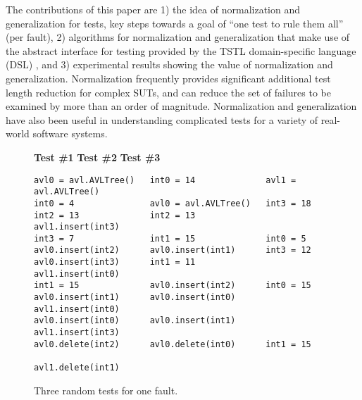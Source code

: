 The contributions of this paper are 1) the idea of normalization and
generalization for tests, key steps towards a goal of
``one test to rule them all'' (per fault), 2) algorithms for
normalization and generalization that make use of the abstract
interface for testing provided by the TSTL \cite{tstl,NFM15,ISSTA15,tstlsttt}
domain-specific language (DSL) \cite{Fow10}, and 3)
experimental results showing the value of normalization and
generalization.  Normalization frequently provides significant additional test length
reduction for complex SUTs, and can reduce
the set of failures to be examined by more than an order of
magnitude.  Normalization and generalization have also been useful in
understanding complicated tests for a variety of real-world software
systems.

\begin{figure}[t]
{\scriptsize
{\bf Test \#1}\hspace{0.415in} {\bf Test \#2} \hspace{0.41in}
{\bf Test \#3}
\begin{verbatim}
avl0 = avl.AVLTree()   int0 = 14              avl1 = avl.AVLTree()
int0 = 4               avl0 = avl.AVLTree()   int3 = 18 
int2 = 13              int2 = 13              avl1.insert(int3) 
int3 = 7               int1 = 15              int0 = 5 
avl0.insert(int2)      avl0.insert(int1)      int3 = 12 
avl0.insert(int3)      int1 = 11              avl1.insert(int0) 
int1 = 15              avl0.insert(int2)      int0 = 15 
avl0.insert(int1)      avl0.insert(int0)      avl1.insert(int0) 
avl0.insert(int0)      avl0.insert(int1)      avl1.insert(int3) 
avl0.delete(int2)      avl0.delete(int0)      int1 = 15 
                                              avl1.delete(int1) 
\end{verbatim}
}
\caption {\scriptsize{Three random tests for one fault.}}
\label{threetests}
\end{figure}

